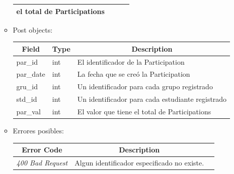 \documentclass{article}
\begin{document}
\begin{enumerate}
\begin{itemize}
\begin{table}[H]
\begin{tabular}{|l|l|l|l|}
        el total de Participations \\ \hline \end{tabular} \end{table} \item
        Post objects: \begin{table}[H] \centering \begin{tabular}{|l|l|l|} \hline
        \multicolumn{1}{|c|}{\textbf{Field}} &
        \multicolumn{1}{c|}{\textbf{Type}} &
        \multicolumn{1}{c|}{\textbf{Description}} \\ \hline par\_id & int & El
        identificador de la Participation \\ \hline par\_date & int & La fecha
        que se creó la Participation \\ \hline gru\_id & int & Un identificador
        para cada grupo registrado \\ \hline std\_id & int & Un identificador
        para cada estudiante registrado \\ \hline par\_val & int & El valor que
        tiene el total de Participations \\ \hline \end{tabular} \end{table}
        \item Errores posibles: \begin{table}[H] \centering \begin{tabular}{|c|c|l|} \hline
        \textbf{Error Code} & \textbf{Description} \\ \hline \textit{400 Bad
        Request} & Algun identificador especificado no existe. \\ \hline
        \end{tabular} \end{table}

    \end{itemize}


\end{enumerate}
\end{document}
